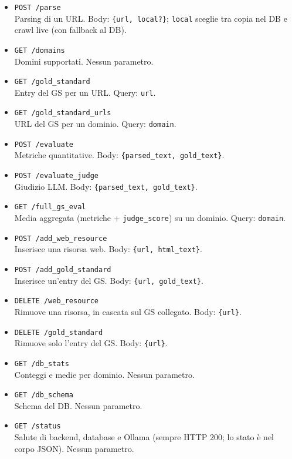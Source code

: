 \documentclass[11pt]{article}
\begin{document}
\begin{itemize}
  \item \texttt{POST /parse}\\
  Parsing di un URL. Body: \texttt{\{url, local?\}}; \texttt{local} sceglie tra copia nel DB e crawl live (con fallback al DB).
  \item \texttt{GET /domains}\\
  Domini supportati. Nessun parametro.
  \item \texttt{GET /gold\_standard}\\
  Entry del GS per un URL. Query: \texttt{url}.
  \item \texttt{GET /gold\_standard\_urls}\\
  URL del GS per un dominio. Query: \texttt{domain}.
  \item \texttt{POST /evaluate}\\
  Metriche quantitative. Body: \texttt{\{parsed\_text, gold\_text\}}.
  \item \texttt{POST /evaluate\_judge}\\
  Giudizio LLM. Body: \texttt{\{parsed\_text, gold\_text\}}.
  \item \texttt{GET /full\_gs\_eval}\\
  Media aggregata (metriche + \texttt{judge\_score}) su un dominio. Query: \texttt{domain}.
  \item \texttt{POST /add\_web\_resource}\\
  Inserisce una risorsa web. Body: \texttt{\{url, html\_text\}}.
  \item \texttt{POST /add\_gold\_standard}\\
  Inserisce un'entry del GS. Body: \texttt{\{url, gold\_text\}}.
  \item \texttt{DELETE /web\_resource}\\
  Rimuove una risorsa, in cascata sul GS collegato. Body: \texttt{\{url\}}.
  \item \texttt{DELETE /gold\_standard}\\
  Rimuove solo l'entry del GS. Body: \texttt{\{url\}}.
  \item \texttt{GET /db\_stats}\\
  Conteggi e medie per dominio. Nessun parametro.
  \item \texttt{GET /db\_schema}\\
  Schema del DB. Nessun parametro.
  \item \texttt{GET /status}\\
  Salute di backend, database e Ollama (sempre HTTP 200; lo stato è nel corpo JSON). Nessun parametro.
\end{itemize}
\end{document}

